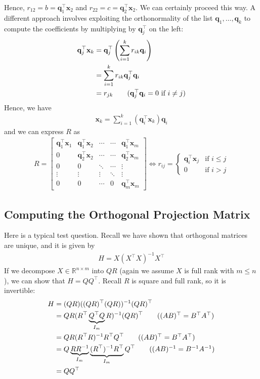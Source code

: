 \documentclass[12pt, a4paper]{article}
\theoremstyle{definition}
\begin{document}
	Hence, $r_{12}=b=\mathbf{q}_1^\top \mathbf{x}_2$ and $r_{22}=c=\mathbf{q}_2^\top \mathbf{x}_2$.
	We can certainly proceed this way. A different approach involves exploiting
	the orthonormality of the list $\mathbf{q}_1,\ldots,\mathbf{q}_k$
	to compute the coefficients by multiplying by $\mathbf{q}_j^\top$ on the left:
	\begin{align*}
		\mathbf{q}_j^\top \mathbf{x}_k &= \mathbf{q}_j^\top \left(
		\sum_{i=1}^{k}r_{ik}\mathbf{q}_i\right)\\
		&=\sum_{i=1}^{k}r_{ik}\mathbf{q}_j^\top \mathbf{q}_i\\
		&=r_{jk}
		\tag{$\mathbf{q}_j^\top \mathbf{q}_i=0$ if $i\neq j$}
	\end{align*}
	Hence, we have
	\begin{align*}
		\mathbf{x}_k = \sum_{i=1}^{k}(\mathbf{q}_i^\top \mathbf{x}_k)\mathbf{q}_i
	\end{align*}
	and we can express $R$ as
	\begin{align*}
		R = \begin{bmatrix}
			\mathbf{q}_1^\top \mathbf{x}_1 & \mathbf{q}_1^\top \mathbf{x}_2  & \cdots & \cdots &
			\mathbf{q}_1^\top \mathbf{x}_m\\
			0 & \mathbf{q}_2^\top \mathbf{x}_2  & \cdots & \cdots &
			\mathbf{q}_2^\top \mathbf{x}_m\\
			0 & 0  & \ddots & \cdots &
			\vdots\\
			\vdots & \vdots & \vdots& \ddots & \vdots\\
			0 & 0 & \cdots & 0 & \mathbf{q}_m^\top \mathbf{x}_m
		\end{bmatrix}
		\iff
		r_{ij}=\begin{cases}
			\mathbf{q}_i^\top \mathbf{x}_j & \text{if } i \leq j\\
			0 & \text{if } i>j
		\end{cases}
	\end{align*}
	\subsection*{Computing the Orthogonal Projection Matrix}
	Here is a typical test question. Recall we have shown that orthogonal matrices are
	unique, and it is given by
	\begin{align*}
		H = X(X^\top X)^{-1}X^\top
	\end{align*}
	If we decompose $X\in\mathbb{R}^{n\times m}$ into $QR$ (again we assume $X$
	is full rank with $m\leq n$), we can show that $H=QQ^\top$. Recall
	$R$ is square and full rank, so it is invertible:
	\begin{align*}
		H &= (QR)((QR)^\top (QR))^{-1}(QR)^\top\\
		&=QR(R^\top \underbrace{Q^\top Q}_{I_{m}}R)^{-1}(QR)^\top
		\tag{$(AB)^\top=B^\top A^\top$}\\
		&=QR(R^\top R)^{-1}R^\top Q^\top
		\tag{$(AB)^\top = B^\top A^\top$}\\
		&=Q\underbrace{RR^{-1}}_{I_m}\underbrace{(R^\top)^{-1}R^\top}_{I_m} Q^\top
		\tag{$(AB)^{-1}=B^{-1}A^{-1}$}\\
		&=QQ^\top
	\end{align*}
\end{document}

